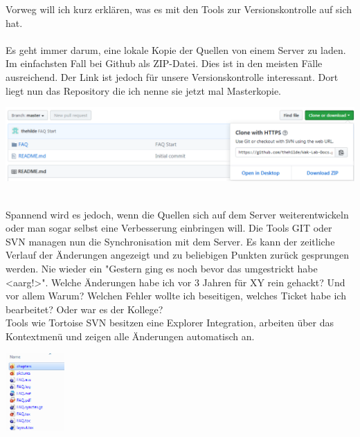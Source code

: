 Vorweg will ich kurz erklären, was es mit den Tools zur Versionskontrolle auf sich hat.\\
\ \\
Es geht immer darum, eine lokale Kopie der Quellen von einem Server zu laden. Im einfachsten Fall bei Github als ZIP-Datei. Dies ist in den meisten Fälle ausreichend. Der Link ist jedoch für unsere Versionskontrolle interessant. Dort liegt nun das Repository die ich nenne sie jetzt mal Masterkopie. \\
\begin{minipage}[t]{\textwidth}
  \centering
  \includegraphics[width=\textwidth]{pictures/Clone.png}
  \label{img:Clone}
\end{minipage}
\ \\
Spannend wird es jedoch, wenn die Quellen sich auf dem Server weiterentwickeln oder man sogar selbst eine Verbesserung einbringen will. Die Tools GIT oder SVN managen nun die Synchronisation mit dem Server. Es kann der zeitliche Verlauf der Änderungen angezeigt und zu beliebigen Punkten zurück gesprungen werden. Nie wieder ein "Gestern ging es noch bevor das umgestrickt habe <aarg!>". Welche Änderungen habe ich vor 3 Jahren für XY rein gehackt? Und vor allem Warum? Welchen Fehler wollte ich beseitigen, welches Ticket habe ich bearbeitet? Oder war es der Kollege?  \\
Tools wie Tortoise SVN besitzen eine Explorer Integration, arbeiten über das Kontextmenü und zeigen alle Änderungen automatisch an. \\
\begin{minipage}[t]{\textwidth}
  \centering
  \includegraphics[height=3cm]{pictures/TortoiseSVNChanges.png}
  \label{img:TortoiseSVNChanges}
\end{minipage}
\ \\
